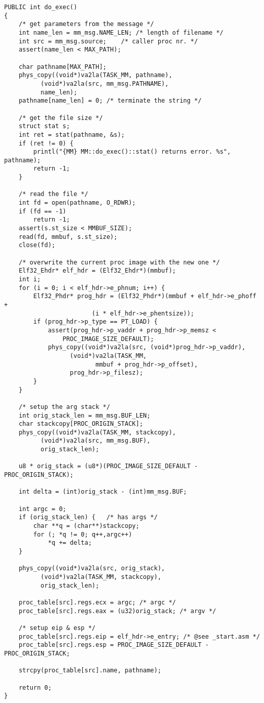 \documentclass{whureport}
\begin{document}
\begin{lstlisting}
PUBLIC int do_exec()
{
	/* get parameters from the message */
	int name_len = mm_msg.NAME_LEN;	/* length of filename */
	int src = mm_msg.source;	/* caller proc nr. */
	assert(name_len < MAX_PATH);

	char pathname[MAX_PATH];
	phys_copy((void*)va2la(TASK_MM, pathname),
		  (void*)va2la(src, mm_msg.PATHNAME),
		  name_len);
	pathname[name_len] = 0;	/* terminate the string */

	/* get the file size */
	struct stat s;
	int ret = stat(pathname, &s);
	if (ret != 0) {
		printl("{MM} MM::do_exec()::stat() returns error. %s", pathname);
		return -1;
	}

	/* read the file */
	int fd = open(pathname, O_RDWR);
	if (fd == -1)
		return -1;
	assert(s.st_size < MMBUF_SIZE);
	read(fd, mmbuf, s.st_size);
	close(fd);

	/* overwrite the current proc image with the new one */
	Elf32_Ehdr* elf_hdr = (Elf32_Ehdr*)(mmbuf);
	int i;
	for (i = 0; i < elf_hdr->e_phnum; i++) {
		Elf32_Phdr* prog_hdr = (Elf32_Phdr*)(mmbuf + elf_hdr->e_phoff +
			 			(i * elf_hdr->e_phentsize));
		if (prog_hdr->p_type == PT_LOAD) {
			assert(prog_hdr->p_vaddr + prog_hdr->p_memsz <
				PROC_IMAGE_SIZE_DEFAULT);
			phys_copy((void*)va2la(src, (void*)prog_hdr->p_vaddr),
				  (void*)va2la(TASK_MM,
						 mmbuf + prog_hdr->p_offset),
				  prog_hdr->p_filesz);
		}
	}

	/* setup the arg stack */
	int orig_stack_len = mm_msg.BUF_LEN;
	char stackcopy[PROC_ORIGIN_STACK];
	phys_copy((void*)va2la(TASK_MM, stackcopy),
		  (void*)va2la(src, mm_msg.BUF),
		  orig_stack_len);

	u8 * orig_stack = (u8*)(PROC_IMAGE_SIZE_DEFAULT - PROC_ORIGIN_STACK);

	int delta = (int)orig_stack - (int)mm_msg.BUF;

	int argc = 0;
	if (orig_stack_len) {	/* has args */
		char **q = (char**)stackcopy;
		for (; *q != 0; q++,argc++)
			*q += delta;
	}

	phys_copy((void*)va2la(src, orig_stack),
		  (void*)va2la(TASK_MM, stackcopy),
		  orig_stack_len);

	proc_table[src].regs.ecx = argc; /* argc */
	proc_table[src].regs.eax = (u32)orig_stack; /* argv */

	/* setup eip & esp */
	proc_table[src].regs.eip = elf_hdr->e_entry; /* @see _start.asm */
	proc_table[src].regs.esp = PROC_IMAGE_SIZE_DEFAULT - PROC_ORIGIN_STACK;

	strcpy(proc_table[src].name, pathname);

	return 0;
}
\end{lstlisting}
\end{document}
